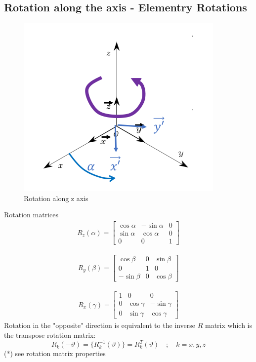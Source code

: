 \documentclass{article}
\begin{document}
 \subsection{Rotation along the axis - Elementry Rotations}
 \begin{figure}[h!]
\centering
\includegraphics[scale=1.5]{rotation.png}
\caption{Rotation along z axis}
\label{fig:sr}
\end{figure}
Rotation matrices
\begin{gather}
    R_{z}(\alpha) =
    \begin{bmatrix}
    \cos\alpha & -\sin\alpha & 0 \\
    \sin\alpha & \cos\alpha & 0 \\
    0 & 0 & 1
    \end{bmatrix}
\end{gather}

\begin{gather}
    R_{y}(\beta) =
    \begin{bmatrix}
    \cos\beta & 0 & \sin\beta  \\
    0 & 1 & 0 \\
    -\sin\beta & 0 & \cos\beta
    \end{bmatrix}
\end{gather}

\begin{gather}
    R_{x}(\gamma) =
    \begin{bmatrix}
    1 & 0 & 0 \\
    0 & \cos\gamma & -\sin\gamma \\
    0 & \sin\gamma & \cos\gamma
    \end{bmatrix}
\end{gather}
Rotation in the "opposite" direction is equivalent to the inverse $ R $ matrix which is the transpose rotation matrix:
$$ R_{k}(-\vartheta) = \{R^{-1}_{k}(\vartheta)\} = R^{T}_{k}(\vartheta) \quad ; \quad k=x,y,z$$
(*) see rotation matrix properties
\end{document}
